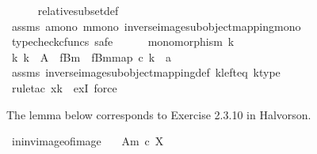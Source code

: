 \begin{isabellebody}
\ \ \ \ \isamarkupfalse%
\ relative{\isacharunderscore}{\kern0pt}subset{\isacharunderscore}{\kern0pt}def{}\ \isanewline
\ \ \ \ \isamarkupfalse%
\ assms\ a{\isacharunderscore}{\kern0pt}mono\ m{\isacharunderscore}{\kern0pt}mono\ inverse{\isacharunderscore}{\kern0pt}image{\isacharunderscore}{\kern0pt}subobject{\isacharunderscore}{\kern0pt}mapping{\isacharunderscore}{\kern0pt}mono\isanewline
\ \ \isamarkupfalse%
\ {\isacharparenleft}{\kern0pt}typecheck{\isacharunderscore}{\kern0pt}cfuncs{\isacharcomma}{\kern0pt}\ safe{\isacharparenright}{\kern0pt}\isanewline
\ \ \ \ \isamarkupfalse%
\ {\isachardoublequoteopen}monomorphism\ k{\isachardoublequoteclose}\isanewline
\ \ \ \ \isamarkupfalse%
\ \isamarkupfalse%
\ {\isachardoublequoteopen}{\isasymexists}k{\isachardot}{\kern0pt}\ k\ {\isacharcolon}{\kern0pt}\ A\ {\isasymrightarrow}\ f\isactrlsup {\isacharminus}{\kern0pt}B{\isasymrparr}\isactrlbsub m\isactrlesub \ {\isasymand}\ {\isacharbrackleft}{\kern0pt}f\isactrlsup {\isacharminus}{\kern0pt}B{\isasymrparr}\isactrlbsub m\isactrlesub {\isacharbrackright}{\kern0pt}map\ {\isasymcirc}\isactrlsub c\ k\ {\isacharequal}{\kern0pt}\ a{\isachardoublequoteclose}\isanewline
\ \ \ \ \ \ \isamarkupfalse%
\ assms{\isacharparenleft}{\kern0pt}{}{\isacharparenright}{\kern0pt}\ inverse{\isacharunderscore}{\kern0pt}image{\isacharunderscore}{\kern0pt}subobject{\isacharunderscore}{\kern0pt}mapping{\isacharunderscore}{\kern0pt}def{}\ k{\isacharunderscore}{\kern0pt}left{\isacharunderscore}{\kern0pt}eq\ k{\isacharunderscore}{\kern0pt}type\ \isanewline
\ \ \ \ \ \ \isamarkupfalse%
\ {\isacharparenleft}{\kern0pt}rule{\isacharunderscore}{\kern0pt}tac\ x{\isacharequal}{\kern0pt}k\ \ exI{\isacharcomma}{\kern0pt}\ force{\isacharparenright}{\kern0pt}\isanewline
\ \ \isamarkupfalse%
\isanewline
{}\isamarkupfalse%
%
\endisatagproof
{\isafoldproof}%
%
\isadelimproof
%
\endisadelimproof
%
\begin{isamarkuptext}%
The lemma below corresponds to Exercise 2.3.10 in Halvorson.%
\end{isamarkuptext}\isamarkuptrue%
\isamarkupfalse%
\ in{\isacharunderscore}{\kern0pt}inv{\isacharunderscore}{\kern0pt}image{\isacharunderscore}{\kern0pt}of{\isacharunderscore}{\kern0pt}image{\isacharcolon}{\kern0pt}\isanewline
\ \ \ {\isachardoublequoteopen}{\isacharparenleft}{\kern0pt}A{\isacharcomma}{\kern0pt}m{\isacharparenright}{\kern0pt}\ {\isasymsubseteq}\isactrlsub c\ X{\isachardoublequoteclose}\ \isanewline

\end{isabellebody}
